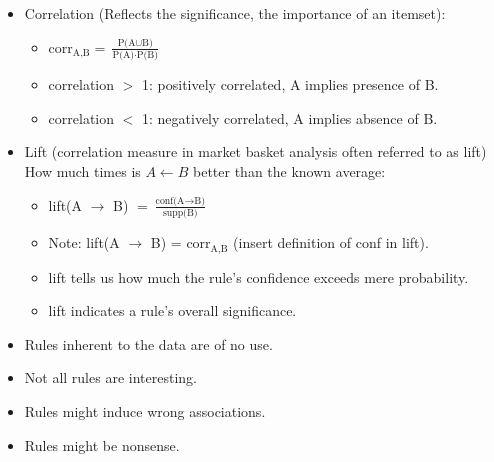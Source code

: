 \begin{breakbox}
\begin{itemize}
	\item Correlation (Reflects the significance, the importance of an itemset):
		\begin{itemize}
			\item[] corr$_\text{A,B} = \frac{\text{P(A} \cup \text{B)}}{\text{P(A)} \cdot \text{P(B)}}$
			\item correlation $>$ 1: positively correlated, A implies presence of B.
			\item correlation $<$ 1: negatively correlated, A implies absence of B.
		\end{itemize}
	\item Lift (correlation measure in market basket analysis often referred to as lift) How much times is $A\leftarrow B$ better than the known average:
		\begin{itemize}
			\item[] lift(A $\rightarrow$ B) $= \frac{\text{conf(A} \rightarrow \text{B)}}{\text{supp(B)}}$
			\item Note: lift(A $\rightarrow$ B) = corr$_\text{A,B}$ (insert definition of conf in lift).
			\item lift tells us how much the rule's confidence exceeds mere probability.
			\item lift indicates a rule's overall significance.
		\end{itemize}
\end{itemize}
\end{breakbox}

\begin{breakbox}
\begin{itemize}
	\item Rules inherent to the data are of no use.
	\item Not all rules are interesting.
	\item Rules might induce wrong associations.
	\item Rules might be nonsense.
\end{itemize}
\end{breakbox}

